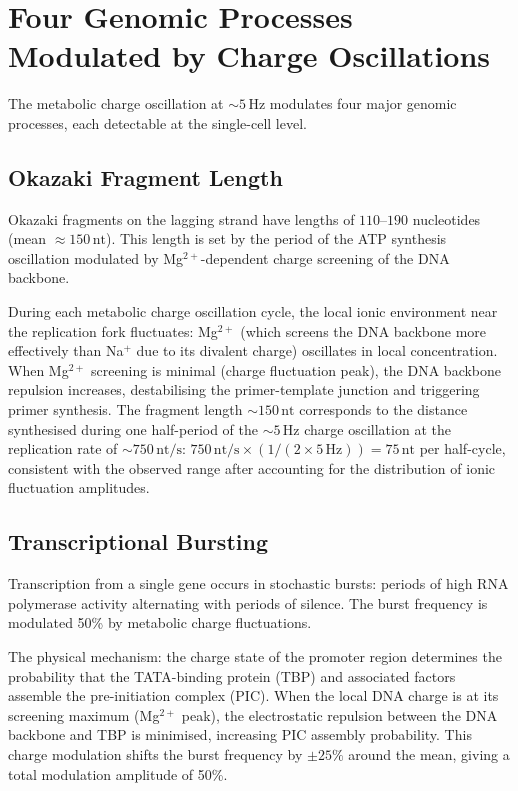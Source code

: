 \section{Four Genomic Processes Modulated by Charge Oscillations}
\label{sec:four_processes}

The metabolic charge oscillation at $\sim 5\,\mathrm{Hz}$ modulates
four major genomic processes, each detectable at the single-cell level.

\subsection{Okazaki Fragment Length}
\label{ssec:okazaki}

Okazaki fragments on the lagging strand have lengths of $110$--$190$
nucleotides (mean $\approx 150\,\mathrm{nt}$). This length is set by
the period of the ATP synthesis oscillation modulated by Mg$^{2+}$-dependent
charge screening of the DNA backbone.

During each metabolic charge oscillation cycle, the local ionic environment
near the replication fork fluctuates: Mg$^{2+}$ (which screens the DNA
backbone more effectively than Na$^+$ due to its divalent charge) oscillates
in local concentration. When Mg$^{2+}$ screening is minimal (charge
fluctuation peak), the DNA backbone repulsion increases, destabilising the
primer-template junction and triggering primer synthesis. The fragment length
$\sim 150\,\mathrm{nt}$ corresponds to the distance synthesised during one
half-period of the $\sim 5\,\mathrm{Hz}$ charge oscillation at the
replication rate of $\sim 750\,\mathrm{nt/s}$:
$750\,\mathrm{nt/s} \times (1/(2 \times 5\,\mathrm{Hz})) = 75\,\mathrm{nt}$
per half-cycle, consistent with the observed range after accounting for
the distribution of ionic fluctuation amplitudes.

\subsection{Transcriptional Bursting}
\label{ssec:tx_bursting}

Transcription from a single gene occurs in stochastic bursts: periods of
high RNA polymerase activity alternating with periods of silence. The
burst frequency is modulated 50\% by metabolic charge fluctuations.

The physical mechanism: the charge state of the promoter region
determines the probability that the TATA-binding protein (TBP) and
associated factors assemble the pre-initiation complex (PIC). When
the local DNA charge is at its screening maximum (Mg$^{2+}$ peak),
the electrostatic repulsion between the DNA backbone and TBP is minimised,
increasing PIC assembly probability. This charge modulation shifts
the burst frequency by $\pm 25\%$ around the mean, giving a total
modulation amplitude of 50\%.


